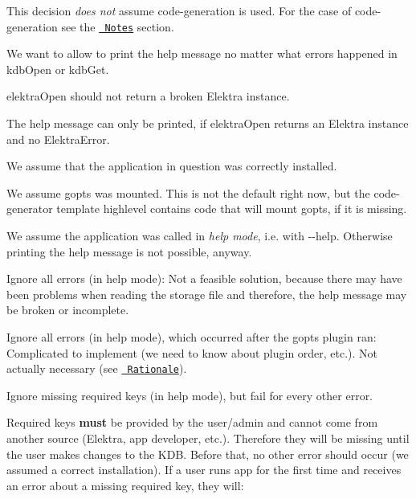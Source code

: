 This decision {\itshape does not} assume code-\/generation is used. For the case of code-\/generation see the \href{\#notes}{\texttt{ Notes}} section.

We want to allow to print the help message no matter what errors happened in {\ttfamily kdb\+Open} or {\ttfamily kdb\+Get}.


\begin{DoxyItemize}
\item {\ttfamily elektra\+Open} should not return a broken {\ttfamily Elektra} instance.
\item The help message can only be printed, if {\ttfamily elektra\+Open} returns an {\ttfamily Elektra} instance and no {\ttfamily Elektra\+Error}.
\end{DoxyItemize}


\begin{DoxyItemize}
\item We assume that the application in question was correctly installed.
\item We assume {\ttfamily gopts} was mounted. This is not the default right now, but the code-\/generator template {\ttfamily highlevel} contains code that will mount {\ttfamily gopts}, if it is missing.
\item We assume the application was called in {\itshape help mode}, i.\+e. with {\ttfamily -\/-\/help}. Otherwise printing the help message is not possible, anyway.
\end{DoxyItemize}


\begin{DoxyItemize}
\item Ignore all errors (in help mode)\+: Not a feasible solution, because there may have been problems when reading the storage file and therefore, the help message may be broken or incomplete.
\item Ignore all errors (in help mode), which occurred after the {\ttfamily gopts} plugin ran\+: Complicated to implement (we need to know about plugin order, etc.). Not actually necessary (see \href{\#rationale}{\texttt{ Rationale}}).
\end{DoxyItemize}

Ignore missing {\ttfamily require}d keys (in help mode), but fail for every other error.

Required keys {\bfseries{must}} be provided by the user/admin and cannot come from another source (Elektra, app developer, etc.). Therefore they will be missing until the user makes changes to the K\+DB. Before that, no other error should occur (we assumed a correct installation). If a user runs {\ttfamily app} for the first time and receives an error about a missing required key, they will\+:


